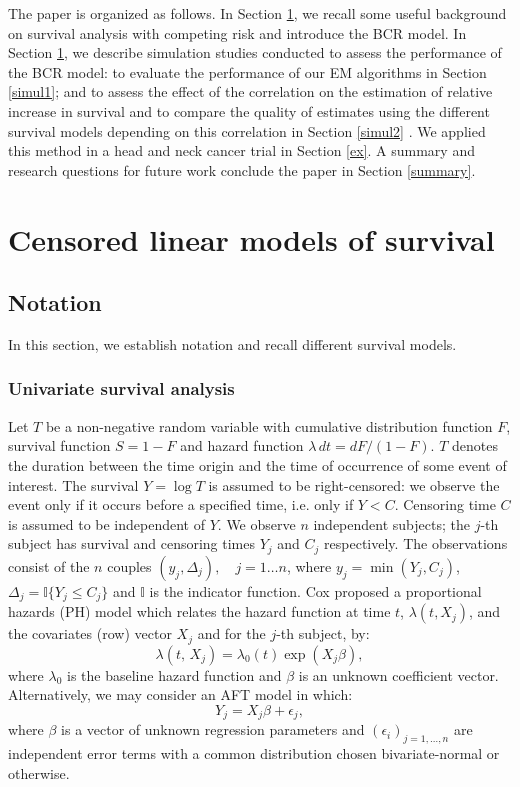 \documentclass[twoside,a4paper,12pt]{article}
\theoremstyle{plain}
\theoremstyle{definition}
\begin{document}
The paper is organized as follows. 
In Section \ref{model}, we recall some useful background on survival analysis 
with competing risk and introduce the BCR model. 
In Section \ref{model}, we describe simulation studies 
conducted to assess the performance of the BCR model:
  to evaluate the performance of our EM algorithms in Section  \ref{simul1}; 
  and
  to assess the effect of the correlation 
    on the estimation of relative increase in survival %
    and
  to compare the quality of estimates using the different survival 
    {models} depending on this correlation in  Section \ref{simul2} . 
We applied this method in a head and neck cancer trial in Section  \ref{ex}. 
A summary and research questions for future  work conclude the paper in Section \ref{summary}.

\section{Censored linear models of survival}\label{model}

\subsection{Notation}

In this section, we establish notation and recall different survival 
models.\\

\subsubsection{Univariate survival analysis}
Let $T$ be a non-negative random variable with cumulative distribution function 
$F$, survival function $S=1-F$ and hazard function  $\lambda \, dt =dF/(1-F)$. 
$T$ denotes the duration between the time origin and the time of occurrence of 
some event of interest. 
The survival $Y= \log T$ is assumed to be right-censored: we observe the event only if it occurs 
before a specified time, i.e. only if  $Y < C$. 
Censoring time $C$ %
is assumed to be independent of $Y$. 
{We} observe $n$ independent subjects; the {$j$-th} subject
has survival and censoring times $Y_j$ and $C_j$ 
respectively. 
The observations consist of the $n$ couples
$(y_j,\Delta_j), \quad {j=1\ldots n}$, where $y_j=\min(Y_j, C_j)$, $\Delta_j=\mathbb I\{Y_j\leq 
C_j\}$ and $\mathbb I$ is the indicator function. 
Cox proposed a proportional hazards (PH) model \citep{Cox1972} which relates the 
hazard function at time $t$, $\lambda(t,X_j)$, and the covariates (row) vector 
$X_j$ and  for the $j$-th subject, by:
$$
\lambda(t, \,X_j)=\lambda_{0}(t)\exp( X_j \beta),
$$
where $\lambda_{0}$ is the baseline hazard function and $\beta$ is an unknown 
coefficient vector. 
Alternatively, we may consider an AFT model in which:
$$
Y_j =X_j \beta+\epsilon_j,
$$
where $\beta$ is a vector of unknown regression parameters and 
$(\epsilon_i)_{j=1,\ldots, n}$ are independent error terms with a common 
distribution chosen bivariate-normal or otherwise. 
\\
\end{document}
